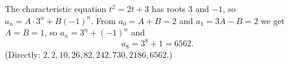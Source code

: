 The characteristic equation $t^2=2t+3$ has roots $3$ and $-1$, so $a_n=A\cdot3^n+B(-1)^n$. From $a_0=A+B=2$ and $a_1=3A-B=2$ we get $A=B=1$, so $a_n=3^n+(-1)^n$ and
\[a_8=3^8+1=\boxed{6562}.\]
(Directly: $2,2,10,26,82,242,730,2186,6562$.)
